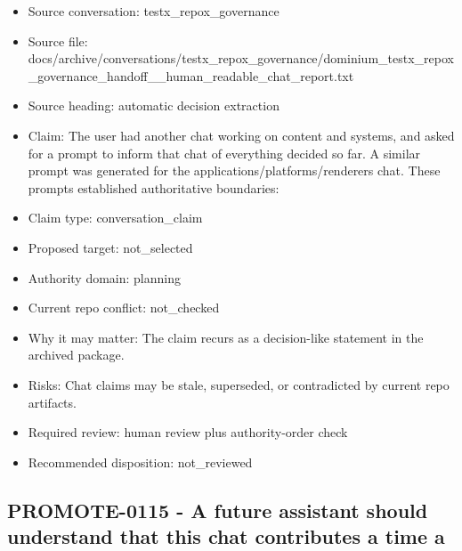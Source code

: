\documentclass[11pt,a4paper]{report}
\begin{document}
\begin{itemize}
\item Source conversation: testx\_repox\_governance
\item Source file: docs/archive/conversations/testx\_repox\_governance/dominium\_testx\_repox\_governance\_handoff\_\_human\_readable\_chat\_report.txt
\item Source heading: automatic decision extraction
\item Claim: The user had another chat working on content and systems, and asked for a prompt to inform that chat of everything decided so far. A similar prompt was generated for the applications/platforms/renderers chat. These prompts established authoritative boundaries:
\item Claim type: conversation\_claim
\item Proposed target: not\_selected
\item Authority domain: planning
\item Current repo conflict: not\_checked
\item Why it may matter: The claim recurs as a decision-like statement in the archived package.
\item Risks: Chat claims may be stale, superseded, or contradicted by current repo artifacts.
\item Required review: human review plus authority-order check
\item Recommended disposition: not\_reviewed
\end{itemize}

\subsection{PROMOTE-0115 - A future assistant should understand that this chat contributes a time a}
\end{document}
